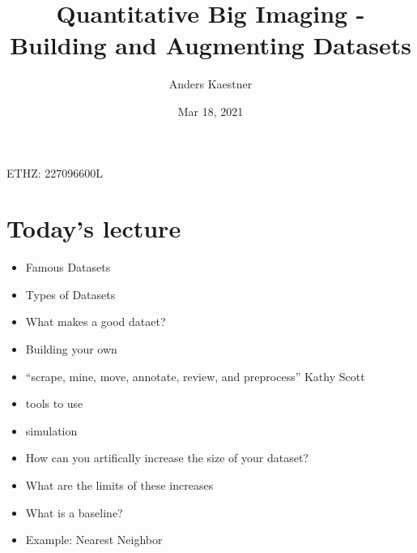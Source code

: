 \documentclass[letterpaper,10pt,english]{sphinxmanual}
\title{Quantitative Big Imaging - Building and Augmenting Datasets}
\date{Mar 18, 2021}
\author{Anders Kaestner}
\begin{document}
\pagestyle{empty}
\sphinxmaketitle
\pagestyle{plain}
\sphinxtableofcontents
\pagestyle{normal}
\label{\detokenize{03-Datasets::doc}}


\sphinxAtStartPar
{} ETHZ: 227\sphinxhyphen{}0966\sphinxhyphen{}00L




\chapter{Today’s lecture}
\label{\detokenize{03-Datasets:today-s-lecture}}
\sphinxAtStartPar
{}
\begin{itemize}
\item {} 
\sphinxAtStartPar
Famous Datasets

\item {} 
\sphinxAtStartPar
Types of Datasets

\item {} 
\sphinxAtStartPar
What makes a good dataet?

\item {} 
\sphinxAtStartPar
Building your own

\item {} 
\sphinxAtStartPar
“scrape, mine, move, annotate, review, and preprocess” \sphinxhyphen{} Kathy Scott

\item {} 
\sphinxAtStartPar
tools to use

\item {} 
\sphinxAtStartPar
simulation

\end{itemize}

\sphinxAtStartPar
{}
\begin{itemize}
\item {} 
\sphinxAtStartPar
How can you artifically increase the size of your dataset?

\item {} 
\sphinxAtStartPar
What are the limits of these increases

\end{itemize}

\sphinxAtStartPar
{}
\begin{itemize}
\item {} 
\sphinxAtStartPar
What is a baseline?

\item {} 
\sphinxAtStartPar
Example: Nearest Neighbor

\end{itemize}
\end{document}
